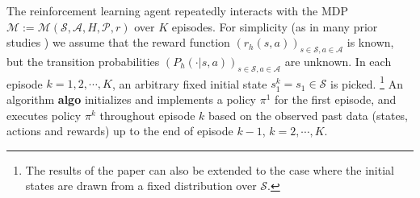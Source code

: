 \documentclass[11pt]{article}
\newcommand{\1}{\mathbbm{1}}
\begin{document}
The reinforcement learning agent repeatedly interacts with the MDP $\mathcal{M}:=\mathcal{M}(\mathcal{S},\mathcal{A},H,\mathcal{P},r)$ over $K$ episodes. %
For simplicity (as in many prior studies \citep{azar2017minimax, du2022risk}) we assume that the reward function $(r_h(s,a))_{s\in\mathcal{S},a\in\mathcal{A}}$ is known, but the transition probabilities $(P_h(\cdot\vert s,a))_{s\in\mathcal{S},a\in\mathcal{A}}$ are unknown. In each episode $k=1,2,\cdots,K$, an arbitrary fixed initial state $s_1^k=s_1\in\mathcal{S}$ is picked.%
\footnote{The results of the paper can also be extended to the case where the initial states are drawn from a fixed distribution over $\mathcal{S}$.} An algorithm \textbf{algo} initializes and implements a policy $\pi^1$ for the first episode, and executes policy $\pi^k$ throughout episode $k$ based on the observed past data (states, actions and rewards) up to the end of episode $k-1$, $k=2,\cdots, K$.  %



\end{document}
